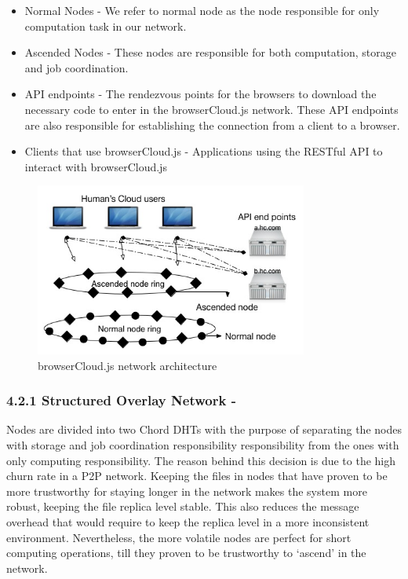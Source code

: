 \begin{itemize}
  \item Normal Nodes - We refer to normal node as the node responsible for only computation task in our network.
  \item Ascended Nodes - These nodes are responsible for both computation, storage and job coordination.
  \item API endpoints - The rendezvous points for the browsers to download the necessary code to enter in the browserCloud.js network. These API endpoints are also responsible for establishing the connection from a client to a browser.
  \item Clients that use browserCloud.js - Applications using the RESTful API to interact with browserCloud.js
\end{itemize}

\begin{figure}[h!]
  \centering
  \includegraphics[width=0.8\textwidth]{img/overall.jpg}
  \caption{browserCloud.js network architecture}
  \label{fig:overallarchitecture}
\end{figure}


\subsubsection{4.2.1 Structured Overlay Network -}

Nodes are divided into two Chord DHTs with the purpose of separating the nodes with storage and job coordination responsibility responsibility from the ones with only computing responsibility. The reason behind this decision is due to the high churn rate in a P2P network. Keeping the files in nodes that have proven to be more trustworthy for staying longer in the network makes the system more robust, keeping the file replica level stable. This also reduces the message overhead that would require to keep the replica level in a more inconsistent environment. Nevertheless, the more volatile nodes are perfect for short computing operations, till they proven to be trustworthy to `ascend' in the network.


